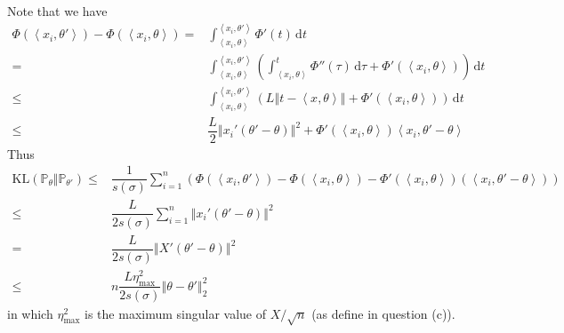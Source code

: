 \documentclass[11pt,a4paper]{ctexart}
\numberwithin{equation}{section}%
\begin{document}
\subsection{}

Note that we have
\begin{align*}
    \Phi(\left\langle x_i,\theta ' \right\rangle )  - \Phi(\left\langle x_i,\theta  \right\rangle ) =& \int_{\left\langle x_i,\theta  \right\rangle }^{\left\langle x_i,\theta ' \right\rangle } \Phi'(t)\,\mathrm{d}t\\
    =& \int_{\left\langle x_i,\theta  \right\rangle }^{\left\langle x_i,\theta ' \right\rangle } \left(\int_{\left\langle x_i,\theta  \right\rangle }^{t} \Phi''(\tau)\,\mathrm{d}\tau + \Phi'(\left\langle x_i,\theta  \right\rangle ) \right) \,\mathrm{d}t\\
    \leq& \int_{\left\langle x_i,\theta  \right\rangle }^{\left\langle x_i,\theta ' \right\rangle } (L\left\Vert t-\left\langle x,\theta  \right\rangle   \right\Vert +  \Phi'(\left\langle x_i,\theta  \right\rangle ) ) \,\mathrm{d}t\\
    \leq& \dfrac{ L }{ 2 }\left\Vert x_i'(\theta '-\theta ) \right\Vert ^2 + \Phi'(\left\langle x_i,\theta  \right\rangle )\left\langle x_i,\theta '-\theta  \right\rangle 
\end{align*}
Thus 
\begin{align*}
    \mathrm{ KL } (\mathbb{P}_\theta \Vert \mathbb{P}_{\theta '} ) \leq &\dfrac{ 1 }{ s(\sigma ) } \sum_{i=1}^n \left( \Phi(\left\langle x_i,\theta ' \right\rangle )  - \Phi(\left\langle x_i,\theta  \right\rangle ) - \Phi'(\left\langle x_i,\theta  \right\rangle )(\left\langle x_i,\theta '-\theta  \right\rangle ) \right)\\
    \leq& \dfrac{ L }{ 2s(\sigma ) } \sum_{i=1}^n \left\Vert x_i'(\theta '-\theta ) \right\Vert^2 \\
    =& \dfrac{ L }{ 2s(\sigma ) } \left\Vert X'(\theta '-\theta ) \right\Vert^2\\
    \leq& n\dfrac{ L\eta^2_{\max} }{ 2s(\sigma ) }\left\Vert \theta -\theta '
     \right\Vert _2^2 
\end{align*}
in which $ \eta_{\max}^2 $ is the maximum singular value of $ X/\sqrt{n} $ (as define in question (c)).

\subsection{}
\end{document}
